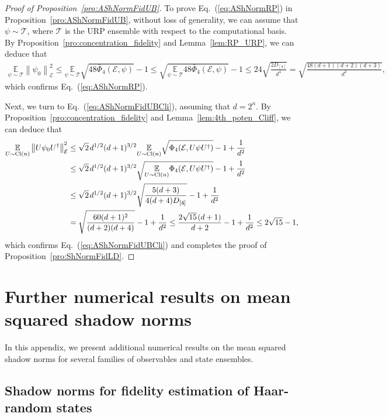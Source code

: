 \documentclass[aps,pra,twocolumn,nofootinbib,superscriptaddress,10pt]{revtex4-2}
\newcommand{\Cl}{\mathrm{Cl}}
\newcommand{\lsp}{\mkern 2mu}           %
\newcommand{\bbE}{\mathbb{E}}
\newcommand{\caE}{\mathcal{E}}
\newcommand{\caT}{\mathcal{T}}
\newcommand{\bPhi}{\bar{\Phi}}
\newcommand{\eref}[1]{Eq.~\textup{(\ref{#1})}}
\newcommand{\lref}[1]{Lemma~\ref{#1}}
\newcommand{\pref}[1]{Proposition~\ref{#1}}
\begin{document}
\begin{proof}[Proof of \pref{pro:AShNormFidUB}]
To prove \eref{eq:AShNormRP} in \pref{pro:AShNormFidUB}, without loss of generality, we can assume that $\psi\sim\caT$, where $\caT$ is the URP ensemble with respect to the computational basis.
By \pref{pro:concentration_fidelity} and \lref{lem:RP_URP}, we can deduce that
\begin{align}
     \underset{\psi\sim\caT}{\bbE}\left\|\psi_0\right\|_\caE^2\le \underset{\psi\sim\caT}{\bbE}\sqrt{48\bPhi_4(\caE,\psi)}-1\le \sqrt{\underset{\psi\sim\caT}{\bbE}48\bPhi_4(\caE,\psi)}-1\le24\sqrt{\frac{2D_{[4]}}{d^4}}=\sqrt{\frac{48(d+1)(d+2)(d+3)}{d^3}},
\end{align}
which confirms \eref{eq:AShNormRP}.


Next, we turn to  \eref{eq:AShNormFidUBCli}, assuming that $d=2^n$. By \pref{pro:concentration_fidelity} and \lref{lem:4th_poten_Cliff}, we can deduce that
\begin{align}
\underset{U\sim \Cl(n)}{ \bbE}\left\|U\psi_0U^\dagger\right\|_\caE^2&\le \sqrt{2}\lsp d^{1/2}(d+1)^{3/2}\underset{U\sim \Cl(n)}{\bbE}\sqrt{\Phi_4(\caE,U\psi U^{\dagger})}-1+\frac{1}{d^2}\nonumber\\&\le \sqrt{2}\lsp d^{1/2}(d+1)^{3/2}\sqrt{\underset{U\sim \Cl(n)}{\bbE}\Phi_4(\caE,U\psi U^{\dagger})}-1+\frac{1}{d^2} \nonumber\\
&\leq \sqrt{2}\lsp d^{1/2}(d+1)^{3/2}\sqrt{\frac{5(d+3)}{4(d+4)D_{[4]}}}-1+\frac{1}{d^2}\nonumber\\
&=\sqrt{\frac{60(d+1)^2}{(d+2)(d+4)}}-1+\frac{1}{d^2}\le \frac{2\sqrt{15}\lsp(d+1)}{d+2}-1+\frac{1}{d^2}\le 2\sqrt{15}-1,
    \end{align}
which confirms \eref{eq:AShNormFidUBCli} and completes the proof of \pref{pro:ShNormFidLD}.
\end{proof}

\section{Further numerical results on mean squared shadow norms}
\label{sup:numerics}

In this appendix, we present additional numerical results on the mean squared shadow norms for several families of observables and state ensembles.



\subsection{Shadow norms for fidelity estimation of Haar-random states}
\label{subsec:haar_numerics}
\end{document}
